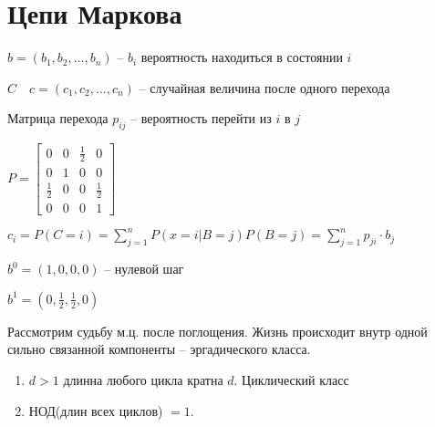 \documentclass{book}
\theoremstyle{definition}
\begin{document}
\section{Цепи Маркова}

$b = \left( b_1, b_2, \ldots, b_n \right) $ -- $b_i$ вероятность находиться в состоянии  $i$

$C\quad c = \left( c_1, c_2, \ldots, c_n \right) $ -- случайная величина после одного перехода

Матрица перехода  $p_{ij}$ -- вероятность перейти из  $i$ в  $j$

$P = \begin{bmatrix} 0&0&\frac{1}{2} &0\\0&1&0&0\\\frac{1}{2} & 0 & 0 &\frac{1}{2}\\0&0&0&1 \end{bmatrix} $

$c_i = P(C=i) = \sum_{j=1}^{n} P\left( x=i | B = j \right) P(B=j) = \sum_{j=1}^{n} p_{ji}\cdot b_j$

$b^0 = \left( 1,0,0,0 \right) $ -- нулевой шаг

$b^1 = (0,\frac{1}{2}, \frac{1}{2}, 0)$

Рассмотрим судьбу м.ц. после поглощения. Жизнь происходит внутр одной сильно связанной компоненты -- эргадического класса. 

\begin{enumerate}
    \item $d > 1$ длинна любого цикла кратна $d$. Циклический класс
    \item НОД(длин всех циклов) $= 1$. 
\end{enumerate}
\end{document}
